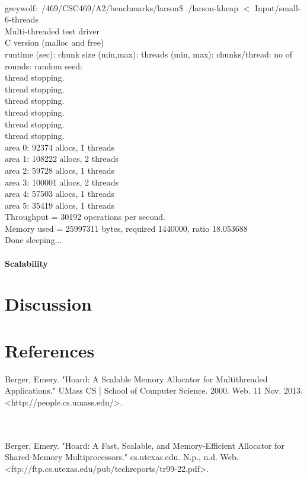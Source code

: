 \documentclass{article}
\begin{document}
\\
greywolf:~/469/CSC469/A2/benchmarks/larson\$  ./larson-kheap $<$ Input/small-6-threads
\\
Multi-threaded test driver 
\\
C version (malloc and free)
\\
runtime (sec): chunk size (min,max): threads (min, max):   chunks/thread:  no of rounds:   random seed:
\\    
thread stopping.
\\
thread stopping.
\\
thread stopping.
\\
thread stopping.
\\
thread stopping.
\\
thread stopping.
\\
area 0: 92374 allocs, 1 threads
\\
area 1: 108222 allocs, 2 threads
\\
area 2: 59728 allocs, 1 threads
\\
area 3: 100001 allocs, 2 threads
\\
area 4: 57503 allocs, 1 threads
\\
area 5: 35419 allocs, 1 threads
\\
Throughput =    30192 operations per second.
\\
Memory used = 25997311 bytes, required 1440000, ratio 18.053688
\\
Done sleeping...
\\
\\

\noindent
\textbf{Scalability}
\\
\section{Discussion}
 

\newpage
\noindent
\section{References}

Berger, Emery. "Hoard: A Scalable Memory Allocator for Multithreaded Applications." UMass CS | School of Computer Science. 2000. Web. 11 Nov. 2013. <http://people.cs.umass.edu/>.

\\
\\
Berger, Emery. "Hoard: A Fast, Scalable, and Memory-Efficient Allocator for Shared-Memory Multiprocessors." cs.utexas.edu. N.p., n.d. Web. <ftp://ftp.cs.utexas.edu/pub/techreports/tr99-22.pdf>.

\end{document}
